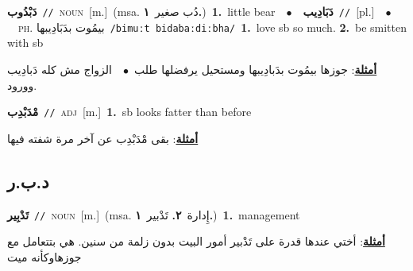 \documentclass[10pt,a4paper,twoside]{article} %
\begin{document}
\begin{multicols}{2}
{\setlength\topsep{0pt}\textbf{\foreignlanguage{arabic}{دَبْدُوب}}\ {\color{gray}\texttt{//}\color{black}}\ \textsc{noun}\ [m.]\ \color{gray}(msa. \foreignlanguage{arabic}{دُب صغير}~\foreignlanguage{arabic}{\textbf{١.}})\color{black}\ \textbf{1.}~little bear\ \ $\bullet$\ \ \setlength\topsep{0pt}\textbf{\foreignlanguage{arabic}{دَبَادِيب}}\ {\color{gray}\texttt{//}\color{black}}\ [pl.]\ \ $\bullet$\ \ \textsc{ph.} \color{gray} \foreignlanguage{arabic}{بيمُوت بدَبَادِيبها}\color{black}\ {\color{gray}\texttt{/{\sffamily bimuːt bidabaːdiːbha}/}\color{black}}\ \textbf{1.}~love sb so much.  \textbf{2.}~be smitten with sb\  \begin{flushright}\color{gray}\foreignlanguage{arabic}{\textbf{\underline{\foreignlanguage{arabic}{أمثلة}}}: جوزها بيمُوت بدَبادِيبها ومستحيل يرفضلها طلب\ $\bullet$\ \  الزواج مش كله دَبادِيب وورود.}\end{flushright}\color{black}} \vspace{2mm}

{\setlength\topsep{0pt}\textbf{\foreignlanguage{arabic}{مْدَبْدِب}}\ {\color{gray}\texttt{//}\color{black}}\ \textsc{adj}\ [m.]\ \textbf{1.}~sb looks fatter than before\  \begin{flushright}\color{gray}\foreignlanguage{arabic}{\textbf{\underline{\foreignlanguage{arabic}{أمثلة}}}: بقى مْدَبْدِب عن آخر مرة شفته فيها}\end{flushright}\color{black}} \vspace{2mm}

\vspace{-3mm}
\subsection*{\color{blue}\foreignlanguage{arabic}{د.ب.ر}\color{blue}{}} 

{\setlength\topsep{0pt}\textbf{\foreignlanguage{arabic}{تَدْبِير}}\ {\color{gray}\texttt{//}\color{black}}\ \textsc{noun}\ [m.]\ \color{gray}(msa. \foreignlanguage{arabic}{إِدارة}~\foreignlanguage{arabic}{\textbf{٢.}}  \foreignlanguage{arabic}{تَدْبير}~\foreignlanguage{arabic}{\textbf{١.}})\color{black}\ \textbf{1.}~management\  \begin{flushright}\color{gray}\foreignlanguage{arabic}{\textbf{\underline{\foreignlanguage{arabic}{أمثلة}}}: أختي عندها قدرة على تَدْبير أمور البيت بدون زلمة من سنين. هي بتتعامل مع جوزهاوكأنه ميت}\end{flushright}\color{black}} \vspace{2mm}


\end{multicols}
\end{document}

